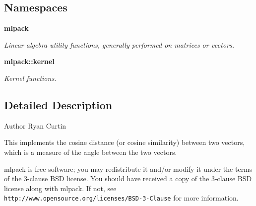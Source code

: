 \subsection*{Namespaces}
\begin{DoxyCompactItemize}
\item 
 \textbf{ mlpack}
\begin{DoxyCompactList}\small\item\em Linear algebra utility functions, generally performed on matrices or vectors. \end{DoxyCompactList}\item 
 \textbf{ mlpack\+::kernel}
\begin{DoxyCompactList}\small\item\em Kernel functions. \end{DoxyCompactList}\end{DoxyCompactItemize}


\subsection{Detailed Description}
\begin{DoxyAuthor}{Author}
Ryan Curtin
\end{DoxyAuthor}
This implements the cosine distance (or cosine similarity) between two vectors, which is a measure of the angle between the two vectors.

mlpack is free software; you may redistribute it and/or modify it under the terms of the 3-\/clause B\+SD license. You should have received a copy of the 3-\/clause B\+SD license along with mlpack. If not, see {\tt http\+://www.\+opensource.\+org/licenses/\+B\+S\+D-\/3-\/\+Clause} for more information. 